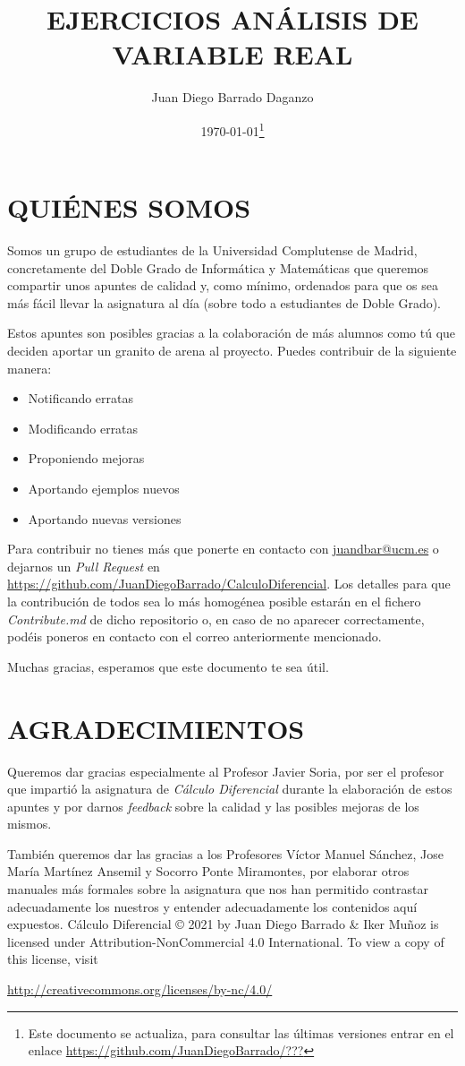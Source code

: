 \documentclass[10pt,a4paper,openright]{book}
\title{\Huge EJERCICIOS ANÁLISIS DE VARIABLE REAL}
\author{Juan Diego Barrado Daganzo} %
\date{\today\footnote{Este documento se actualiza, para consultar las últimas versiones entrar en el enlace \url{https://github.com/JuanDiegoBarrado/???}}}
\begin{document}
\maketitle
\frontmatter
\section*{QUIÉNES SOMOS}
Somos un grupo de estudiantes de la Universidad Complutense de Madrid, concretamente del Doble Grado de Informática y Matemáticas que queremos compartir unos apuntes de calidad y, como mínimo, ordenados para que os sea más fácil llevar la asignatura al día (sobre todo a estudiantes de Doble Grado).

Estos apuntes son posibles gracias a la colaboración de más alumnos como tú que deciden aportar un granito de arena al proyecto. Puedes contribuir de la siguiente manera:
\begin{itemize}
\item Notificando erratas
\item Modificando erratas
\item Proponiendo mejoras
\item Aportando ejemplos nuevos
\item Aportando nuevas versiones
\end{itemize}
Para contribuir no tienes más que ponerte en contacto con \href{mailto:juandbar@ucm.es}{juandbar@ucm.es} o dejarnos un \textit{Pull Request} en \url{https://github.com/JuanDiegoBarrado/CalculoDiferencial}. Los detalles para que la contribución de todos sea lo más homogénea posible estarán en el fichero \textit{Contribute.md} de dicho repositorio o, en caso de no aparecer correctamente, podéis poneros en contacto con el correo anteriormente mencionado.

Muchas gracias, esperamos que este documento te sea útil.

\section*{AGRADECIMIENTOS}
Queremos dar gracias especialmente al Profesor Javier Soria, por ser el profesor que impartió la asignatura de \textit{Cálculo Diferencial} durante la elaboración de estos apuntes y por darnos \textit{feedback} sobre la calidad y las posibles mejoras de los mismos.

También queremos dar las gracias a los Profesores Víctor Manuel Sánchez, Jose María Martínez Ansemil y Socorro Ponte Miramontes, por elaborar otros manuales más formales sobre la asignatura que nos han permitido contrastar adecuadamente los nuestros y entender adecuadamente los contenidos aquí expuestos.
\vfill
Cálculo Diferencial © 2021 by Juan Diego Barrado \& Iker Muñoz is licensed under Attribution-NonCommercial 4.0 International. To view a copy of this license, visit
\begin{center}
\url{http://creativecommons.org/licenses/by-nc/4.0/}
\end{center}
\end{document}
